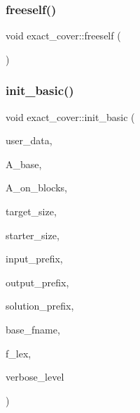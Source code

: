 \mbox{\label{classexact__cover_ab3fdbad938ba36644e262b620fca8def}} 
\subsubsection{\texorpdfstring{freeself()}{freeself()}}
{\footnotesize\ttfamily void exact\+\_\+cover\+::freeself (\begin{DoxyParamCaption}{ }\end{DoxyParamCaption})}

\mbox{\label{classexact__cover_a188961cda99906946f33aea0bef3c6ce}} 
\subsubsection{\texorpdfstring{init\+\_\+basic()}{init\_basic()}}
{\footnotesize\ttfamily void exact\+\_\+cover\+::init\+\_\+basic (\begin{DoxyParamCaption}\item[{void $\ast$}]{user\+\_\+data,  }\item[{\mbox{\hyperlink{classaction}{action}} $\ast$}]{A\+\_\+base,  }\item[{\mbox{\hyperlink{classaction}{action}} $\ast$}]{A\+\_\+on\+\_\+blocks,  }\item[{\mbox{\hyperlink{galois_8h_a09fddde158a3a20bd2dcadb609de11dc}{I\+NT}}}]{target\+\_\+size,  }\item[{\mbox{\hyperlink{galois_8h_a09fddde158a3a20bd2dcadb609de11dc}{I\+NT}}}]{starter\+\_\+size,  }\item[{const \mbox{\hyperlink{galois_8h_ab6cc7b4aeb6ea31aba2b3fbfc83ff5e6}{B\+Y\+TE}} $\ast$}]{input\+\_\+prefix,  }\item[{const \mbox{\hyperlink{galois_8h_ab6cc7b4aeb6ea31aba2b3fbfc83ff5e6}{B\+Y\+TE}} $\ast$}]{output\+\_\+prefix,  }\item[{const \mbox{\hyperlink{galois_8h_ab6cc7b4aeb6ea31aba2b3fbfc83ff5e6}{B\+Y\+TE}} $\ast$}]{solution\+\_\+prefix,  }\item[{const \mbox{\hyperlink{galois_8h_ab6cc7b4aeb6ea31aba2b3fbfc83ff5e6}{B\+Y\+TE}} $\ast$}]{base\+\_\+fname,  }\item[{\mbox{\hyperlink{galois_8h_a09fddde158a3a20bd2dcadb609de11dc}{I\+NT}}}]{f\+\_\+lex,  }\item[{\mbox{\hyperlink{galois_8h_a09fddde158a3a20bd2dcadb609de11dc}{I\+NT}}}]{verbose\+\_\+level }\end{DoxyParamCaption})}

